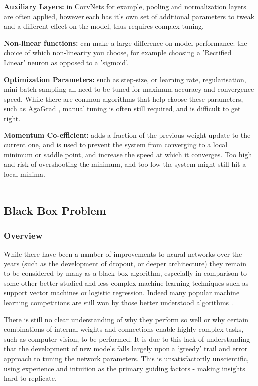 \documentclass[a4paper,11pt,titlepage]{article}
\begin{document}
		\par 
		\textbf{Auxiliary Layers:} in ConvNets for example, pooling and normalization layers are often applied, however each has it's own set of additional parameters to tweak and a different effect on the model, thus requires complex tuning.
		\par 
		\textbf{Non-linear functions:} can make a large difference on model performance: the choice of which non-linearity you choose, for example choosing a 'Rectified Linear' neuron as opposed to a 'sigmoid'. 
		\par 
		\textbf{Optimization Parameters:} such as step-size, or learning rate, regularisation, mini-batch sampling all need to be tuned for maximum accuracy and convergence speed. While there are common algorithms that help choose these parameters, such as AgaGrad \cite{Duchi2011}, manual tuning is often still required, and is difficult to get right.
		\par
		\textbf{Momentum Co-efficient:} adds a fraction of the previous weight update to the current one, and is used to prevent the system from converging to a local minimum or saddle point, and increase the speed at which it converges. Too high and risk of overshooting the minimum, and too low the system might still hit a local minima.
\\\
	\subsection{Black Box Problem}
		\subsubsection{Overview}
		While there have been a number of improvements to neural networks over the years (such as the development of dropout, or deeper architecture) they remain to be considered by many as a black box algorithm, especially in comparison to some other better studied and less complex machine learning techniques such as support vector machines or logistic regression. Indeed many popular machine learning competitions are still won by those better understood algorithms \cite{Adams2015}.
		\par 
		There is still no clear understanding of why they perform so well or why certain combinations of internal weights and connections enable highly complex tasks, such as computer vision, to be performed. It is due to this lack of understanding that the development of new models falls largely upon a `greedy' trail and error approach to tuning the network parameters. This is unsatisfactorily unscientific, using experience and intuition as the primary guiding factors - making insights hard to replicate.
		\par
\end{document}
